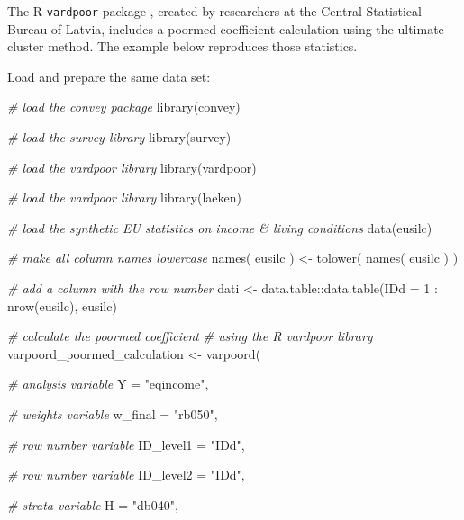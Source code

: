 \documentclass[
]{book}
\newenvironment{Shaded}{\begin{snugshade}}{\end{snugshade}}
\newcommand{\AttributeTok}[1]{\textcolor[rgb]{0.77,0.63,0.00}{#1}}
\newcommand{\CommentTok}[1]{\textcolor[rgb]{0.56,0.35,0.01}{\textit{#1}}}
\newcommand{\DecValTok}[1]{\textcolor[rgb]{0.00,0.00,0.81}{#1}}
\newcommand{\FunctionTok}[1]{\textcolor[rgb]{0.00,0.00,0.00}{#1}}
\newcommand{\NormalTok}[1]{#1}
\newcommand{\OtherTok}[1]{\textcolor[rgb]{0.56,0.35,0.01}{#1}}
\newcommand{\SpecialCharTok}[1]{\textcolor[rgb]{0.00,0.00,0.00}{#1}}
\newcommand{\StringTok}[1]{\textcolor[rgb]{0.31,0.60,0.02}{#1}}
\begin{document}
The R \texttt{vardpoor} package \autocite{vardpoor}, created by researchers at the Central Statistical Bureau of Latvia, includes a poormed coefficient calculation using the ultimate cluster method. The example below reproduces those statistics.

Load and prepare the same data set:

\begin{Shaded}
\begin{Highlighting}[]
\CommentTok{\# load the convey package}
\FunctionTok{library}\NormalTok{(convey)}

\CommentTok{\# load the survey library}
\FunctionTok{library}\NormalTok{(survey)}

\CommentTok{\# load the vardpoor library}
\FunctionTok{library}\NormalTok{(vardpoor)}

\CommentTok{\# load the vardpoor library}
\FunctionTok{library}\NormalTok{(laeken)}

\CommentTok{\# load the synthetic EU statistics on income \& living conditions}
\FunctionTok{data}\NormalTok{(eusilc)}

\CommentTok{\# make all column names lowercase}
\FunctionTok{names}\NormalTok{( eusilc ) }\OtherTok{\textless{}{-}} \FunctionTok{tolower}\NormalTok{( }\FunctionTok{names}\NormalTok{( eusilc ) )}

\CommentTok{\# add a column with the row number}
\NormalTok{dati }\OtherTok{\textless{}{-}}\NormalTok{ data.table}\SpecialCharTok{::}\FunctionTok{data.table}\NormalTok{(}\AttributeTok{IDd =} \DecValTok{1} \SpecialCharTok{:} \FunctionTok{nrow}\NormalTok{(eusilc), eusilc)}

\CommentTok{\# calculate the poormed coefficient}
\CommentTok{\# using the R vardpoor library}
\NormalTok{varpoord\_poormed\_calculation }\OtherTok{\textless{}{-}}
    \FunctionTok{varpoord}\NormalTok{(}
    
        \CommentTok{\# analysis variable}
        \AttributeTok{Y =} \StringTok{"eqincome"}\NormalTok{, }
        
        \CommentTok{\# weights variable}
        \AttributeTok{w\_final =} \StringTok{"rb050"}\NormalTok{,}
        
        \CommentTok{\# row number variable}
        \AttributeTok{ID\_level1 =} \StringTok{"IDd"}\NormalTok{,}

        \CommentTok{\# row number variable}
        \AttributeTok{ID\_level2 =} \StringTok{"IDd"}\NormalTok{,}
                
        \CommentTok{\# strata variable}
        \AttributeTok{H =} \StringTok{"db040"}\NormalTok{, }
        

\end{Highlighting}
\end{Shaded}
\end{document}
